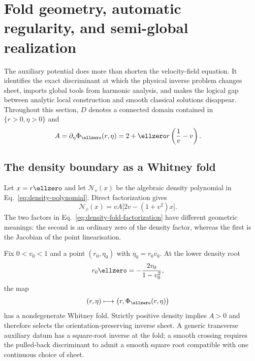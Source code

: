 \section{Fold geometry, automatic regularity, and semi-global realization}
\label{sec:analytic-global-structure}

The auxiliary potential does more than shorten the velocity-field equation.
It identifies the exact discriminant at which the physical inverse problem
changes sheet, imports global tools from harmonic analysis, and makes the
logical gap between analytic local construction and smooth classical
solutions disappear. Throughout this section, $D$ denotes a connected
domain contained in $\{r>0,\eta>0\}$ and
$$
A=\partial_\eta\Phi_{\ellzero}(r,\eta)
=2+\ellzero r\left(\frac1v-v\right).
$$

\subsection{The density boundary as a Whitney fold}

Let $x=r\ellzero$ and let $\mathcal N_v(x)$ be the algebraic density
polynomial in Eq.~\eqref{eq:density-polynomial}. Direct factorization gives
\begin{equation}
\mathcal N_v(x)
=vA\bigl[2v-(1+v^2)x\bigr].
\label{eq:density-fold-factorization}
\end{equation}
The two factors in Eq.~\eqref{eq:density-fold-factorization} have different
geometric meanings: the second is an ordinary zero of the density factor,
whereas the first is the Jacobian of the point linearisation.

\begin{theorem}
\label{thm:density-whitney-fold}
Fix $0<v_0<1$ and a point $(r_0,\eta_0)$ with $\eta_0=r_0v_0$. At the lower
density root
$$
r_0\ellzero=-\frac{2v_0}{1-v_0^2},
$$
the map
$$
(r,\eta)\longmapsto\bigl(r,\Phi_{\ellzero}(r,\eta)\bigr)
$$
has a nondegenerate Whitney fold. Strictly positive density implies $A>0$
and therefore selects the orientation-preserving inverse sheet. A generic
transverse auxiliary datum has a square-root inverse at the fold; a smooth
crossing requires the pulled-back discriminant to admit a smooth square root
compatible with one continuous choice of sheet.
\end{theorem}

